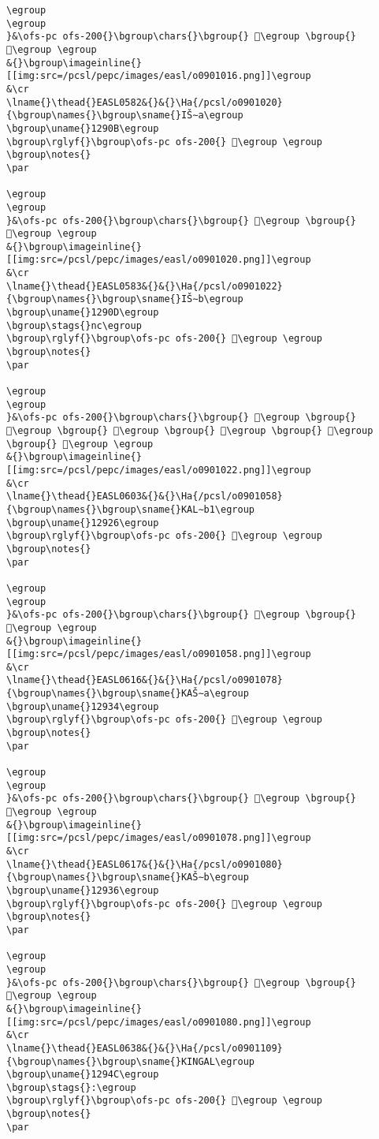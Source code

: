 \begin{verbatim}
\egroup
\egroup
}&\ofs-pc ofs-200{}\bgroup\chars{}\bgroup{} 𒤈\egroup \bgroup{} 𒤉\egroup \egroup
&{}\bgroup\imageinline{}[[img:src=/pcsl/pepc/images/easl/o0901016.png]]\egroup
&\cr
\lname{}\thead{}EASL0582&{}&{}\Ha{/pcsl/o0901020}{\bgroup\names{}\bgroup\sname{}IŠ∼a\egroup
\bgroup\uname{}1290B\egroup
\bgroup\rglyf{}\bgroup\ofs-pc ofs-200{} 𒤋\egroup \egroup
\bgroup\notes{}
\par 

\egroup
\egroup
}&\ofs-pc ofs-200{}\bgroup\chars{}\bgroup{} 𒤌\egroup \bgroup{} 𒤋\egroup \egroup
&{}\bgroup\imageinline{}[[img:src=/pcsl/pepc/images/easl/o0901020.png]]\egroup
&\cr
\lname{}\thead{}EASL0583&{}&{}\Ha{/pcsl/o0901022}{\bgroup\names{}\bgroup\sname{}IŠ∼b\egroup
\bgroup\uname{}1290D\egroup
\bgroup\stags{}nc\egroup
\bgroup\rglyf{}\bgroup\ofs-pc ofs-200{} 𒤍\egroup \egroup
\bgroup\notes{}
\par 

\egroup
\egroup
}&\ofs-pc ofs-200{}\bgroup\chars{}\bgroup{} 𒤍\egroup \bgroup{} 𒤎\egroup \bgroup{} 𒤏\egroup \bgroup{} 𒤐\egroup \bgroup{} 𒤑\egroup \bgroup{} 𒤒\egroup \egroup
&{}\bgroup\imageinline{}[[img:src=/pcsl/pepc/images/easl/o0901022.png]]\egroup
&\cr
\lname{}\thead{}EASL0603&{}&{}\Ha{/pcsl/o0901058}{\bgroup\names{}\bgroup\sname{}KAL∼b1\egroup
\bgroup\uname{}12926\egroup
\bgroup\rglyf{}\bgroup\ofs-pc ofs-200{} 𒤦\egroup \egroup
\bgroup\notes{}
\par 

\egroup
\egroup
}&\ofs-pc ofs-200{}\bgroup\chars{}\bgroup{} 𒤦\egroup \bgroup{} 𒤧\egroup \egroup
&{}\bgroup\imageinline{}[[img:src=/pcsl/pepc/images/easl/o0901058.png]]\egroup
&\cr
\lname{}\thead{}EASL0616&{}&{}\Ha{/pcsl/o0901078}{\bgroup\names{}\bgroup\sname{}KAŠ∼a\egroup
\bgroup\uname{}12934\egroup
\bgroup\rglyf{}\bgroup\ofs-pc ofs-200{} 𒤴\egroup \egroup
\bgroup\notes{}
\par 

\egroup
\egroup
}&\ofs-pc ofs-200{}\bgroup\chars{}\bgroup{} 𒤵\egroup \bgroup{} 𒤴\egroup \egroup
&{}\bgroup\imageinline{}[[img:src=/pcsl/pepc/images/easl/o0901078.png]]\egroup
&\cr
\lname{}\thead{}EASL0617&{}&{}\Ha{/pcsl/o0901080}{\bgroup\names{}\bgroup\sname{}KAŠ∼b\egroup
\bgroup\uname{}12936\egroup
\bgroup\rglyf{}\bgroup\ofs-pc ofs-200{} 𒤶\egroup \egroup
\bgroup\notes{}
\par 

\egroup
\egroup
}&\ofs-pc ofs-200{}\bgroup\chars{}\bgroup{} 𒤸\egroup \bgroup{} 𒤶\egroup \egroup
&{}\bgroup\imageinline{}[[img:src=/pcsl/pepc/images/easl/o0901080.png]]\egroup
&\cr
\lname{}\thead{}EASL0638&{}&{}\Ha{/pcsl/o0901109}{\bgroup\names{}\bgroup\sname{}KINGAL\egroup
\bgroup\uname{}1294C\egroup
\bgroup\stags{}:\egroup
\bgroup\rglyf{}\bgroup\ofs-pc ofs-200{} 𒥌\egroup \egroup
\bgroup\notes{}
\par 


\end{verbatim}
